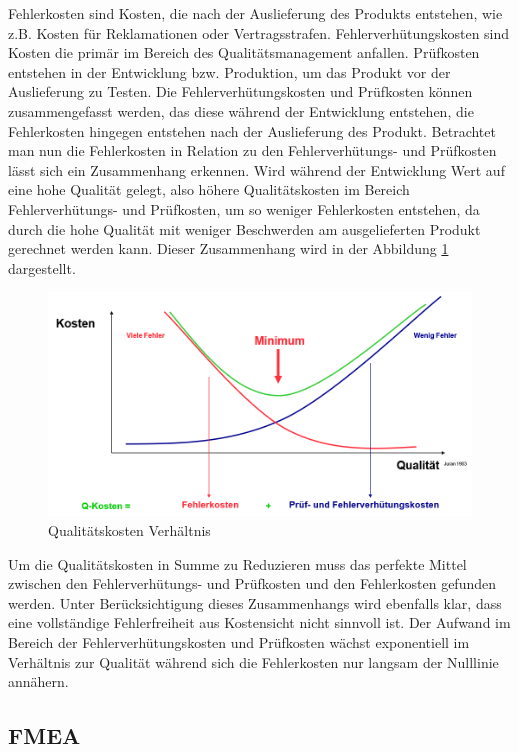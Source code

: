 Fehlerkosten sind Kosten, die nach der Auslieferung des Produkts entstehen, wie z.B. Kosten für Reklamationen oder Vertragsstrafen.
Fehlerverhütungskosten sind Kosten die primär im Bereich des Qualitätsmanagement anfallen.
Prüfkosten entstehen in der Entwicklung bzw. Produktion, um das Produkt vor der Auslieferung zu Testen.
Die Fehlerverhütungskosten und Prüfkosten können zusammengefasst werden, das diese während der Entwicklung entstehen, die Fehlerkosten hingegen entstehen nach der Auslieferung des Produkt.
\newparagraph
Betrachtet man nun die Fehlerkosten in Relation zu den Fehlerverhütungs- und Prüfkosten lässt sich ein Zusammenhang erkennen.
Wird während der Entwicklung Wert auf eine hohe Qualität gelegt, also höhere Qualitätskosten im Bereich Fehlerverhütungs- und Prüfkosten, um so weniger Fehlerkosten entstehen, da durch die hohe Qualität mit weniger Beschwerden am ausgelieferten Produkt gerechnet werden kann.
Dieser Zusammenhang wird in der Abbildung \ref{fig:QKostenVerhaeltnis} dargestellt.
\begin{figure}[H]
    \centering
    \includegraphics[width=1\textwidth]{images/qkostenverhaeltnis.png}
    \caption{Qualitätskosten Verhältnis}
    \label{fig:QKostenVerhaeltnis}
\end{figure}\noindent
Um die Qualitätskosten in Summe zu Reduzieren muss das perfekte Mittel zwischen den Fehlerverhütungs- und Prüfkosten und den Fehlerkosten gefunden werden.
Unter Berücksichtigung dieses Zusammenhangs wird ebenfalls klar, dass eine vollständige Fehlerfreiheit aus Kostensicht nicht sinnvoll ist.
Der Aufwand im Bereich der Fehlerverhütungskosten und Prüfkosten wächst exponentiell im Verhältnis zur Qualität während sich die Fehlerkosten nur langsam der Nulllinie annähern. 

% 



\subsection{\acl{FMEA}}






